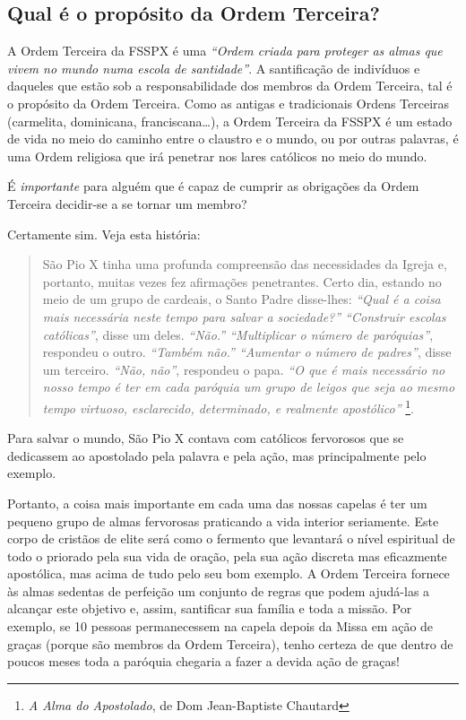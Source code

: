\documentclass[11pt]{article}
\begin{document}
\subsection{Qual é o propósito da Ordem Terceira?}\label{subsec:qual-é-o-propósito-da-ordem-terceira?}

A Ordem Terceira da FSSPX é uma \textit{``Ordem criada para proteger as almas que vivem no mundo numa escola de santidade''}.
A santificação de indivíduos e daqueles que estão sob a responsabilidade dos membros da Ordem Terceira, tal é o propósito da Ordem Terceira.
Como as antigas e tradicionais Ordens Terceiras (carmelita, dominicana, franciscana\ldots), a Ordem Terceira da FSSPX é um estado de vida no meio do caminho entre o claustro e o mundo, ou por outras palavras, é uma Ordem religiosa que irá penetrar nos lares católicos no meio do mundo.

É \textit{importante} para alguém que é capaz de cumprir as obrigações da Ordem Terceira decidir-se a se tornar um membro?

Certamente sim.
Veja esta história:

\begin{quote}São Pio X tinha uma profunda compreensão das necessidades da Igreja e, portanto, muitas vezes fez afirmações penetrantes.
Certo dia, estando no meio de um grupo de cardeais, o Santo Padre disse-lhes: \textit{``Qual é a coisa mais necessária neste tempo para salvar a sociedade?'' ``Construir escolas católicas''}, disse um deles.  \textit{``Não.'' ``Multiplicar o número de paróquias''}, respondeu o outro. \textit{``Também não.'' ``Aumentar o número de padres''}, disse um terceiro. \textit{``Não, não''}, respondeu o papa. \textit{``O que é mais necessário no nosso tempo é ter em cada paróquia um grupo de leigos que seja ao mesmo tempo virtuoso, esclarecido, determinado, e realmente apostólico''} \footnote{\textit{A Alma do Apostolado}, de Dom Jean-Baptiste Chautard}.\end{quote}

Para salvar o mundo, São Pio X contava com católicos fervorosos que se dedicassem ao apostolado pela palavra e pela ação, mas principalmente pelo exemplo.

Portanto, a coisa mais importante em cada uma das nossas capelas é ter um pequeno grupo de almas fervorosas praticando a vida interior seriamente.
Este corpo de cristãos de elite será como o fermento que levantará o nível espiritual de todo o priorado pela sua vida de oração, pela sua ação discreta mas eficazmente apostólica, mas acima de tudo pelo seu bom exemplo.
A Ordem Terceira fornece às almas sedentas de perfeição um conjunto de regras que podem ajudá-las a alcançar este objetivo e, assim, santificar sua família e toda a missão.
Por exemplo, se 10 pessoas permanecessem na capela depois da Missa em ação de graças (porque são membros da Ordem Terceira), tenho certeza de que dentro de poucos meses toda a paróquia chegaria a fazer a devida ação de graças!
\end{document}

